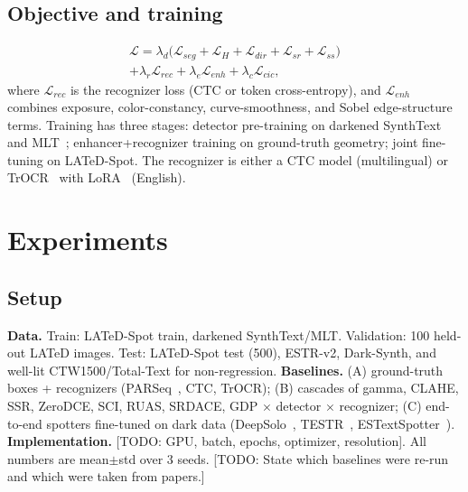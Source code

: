 \documentclass[journal]{IEEEtran}
\newcommand{\todo}[1]{{\color{red}[TODO: #1]}}
\begin{document}
\subsection{Objective and training}
\begin{multline}
\mathcal{L}=\lambda_{d}\big(\mathcal{L}_{seg}+\mathcal{L}_{H}+\mathcal{L}_{dir}+\mathcal{L}_{sr}+\mathcal{L}_{ss}\big)\\
+\lambda_{r}\mathcal{L}_{rec}+\lambda_{e}\mathcal{L}_{enh}+\lambda_{c}\mathcal{L}_{cic},
\end{multline}
where $\mathcal{L}_{rec}$ is the recognizer loss (CTC or token cross-entropy), and $\mathcal{L}_{enh}$ combines exposure, color-constancy, curve-smoothness, and Sobel edge-structure terms. Training has three stages: detector pre-training on darkened SynthText~\cite{gupta2016synthtext} and MLT~\cite{nayef2017mlt}; enhancer+recognizer training on ground-truth geometry; joint fine-tuning on LATeD-Spot. The recognizer is either a CTC model (multilingual) or TrOCR~\cite{li2023trocr} with LoRA~\cite{hu2022lora} (English).

\section{Experiments}
\subsection{Setup}
\textbf{Data.} Train: LATeD-Spot train, darkened SynthText/MLT. Validation: 100 held-out LATeD images. Test: LATeD-Spot test (500), ESTR-v2, Dark-Synth, and well-lit CTW1500/Total-Text for non-regression. \textbf{Baselines.} (A) ground-truth boxes + recognizers (PARSeq~\cite{bautista2022parseq}, CTC, TrOCR); (B) cascades of {gamma, CLAHE, SSR, ZeroDCE, SCI, RUAS, SRDACE, GDP} $\times$ detector $\times$ recognizer; (C) end-to-end spotters fine-tuned on dark data (DeepSolo~\cite{ye2023deepsolo}, TESTR~\cite{zhang2022testr}, ESTextSpotter~\cite{huang2023estextspotter}). \textbf{Implementation.} \todo{GPU, batch, epochs, optimizer, resolution}. All numbers are mean$\pm$std over 3 seeds. \todo{State which baselines were re-run and which were taken from papers.}
\end{document}
